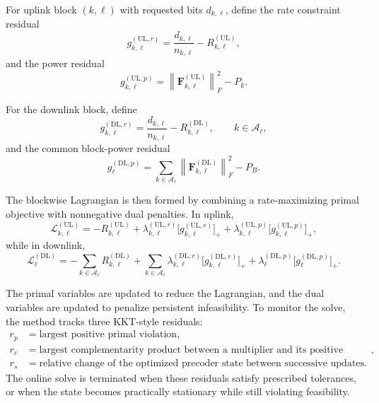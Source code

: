 \documentclass[11pt]{article}
\newcommand{\Aset}{\mathcal{A}}
\newcommand{\F}{\mathbf{F}}
\newcommand{\norm}[1]{\left\lVert #1 \right\rVert}
\newcommand{\UL}{\mathrm{UL}}
\newcommand{\DL}{\mathrm{DL}}
\begin{document}
For uplink block $(k,\ell)$ with requested bits $d_{k,\ell}$, define the rate
constraint residual
\begin{equation}
g_{k,\ell}^{(\UL,r)}
=
\frac{d_{k,\ell}}{n_{k,\ell}} - R_{k,\ell}^{(\UL)},
\label{eq:ul-rate-residual}
\end{equation}
and the power residual
\begin{equation}
g_{k,\ell}^{(\UL,p)}
=
\norm{\F_{k,\ell}^{(\UL)}}_F^2 - P_k.
\label{eq:ul-power-residual}
\end{equation}

For the downlink block, define
\begin{equation}
g_{k,\ell}^{(\DL,r)}
=
\frac{d_{k,\ell}}{n_{k,\ell}} - R_{k,\ell}^{(\DL)},
\qquad k\in\Aset_\ell,
\label{eq:dl-rate-residual}
\end{equation}
and the common block-power residual
\begin{equation}
g_{\ell}^{(\DL,p)}
=
\sum_{k\in\Aset_\ell}\norm{\F_{k,\ell}^{(\DL)}}_F^2 - P_B.
\label{eq:dl-power-residual}
\end{equation}

The blockwise Lagrangian is then formed by combining a rate-maximizing primal
objective with nonnegative dual penalties. In uplink,
\begin{equation}
\mathcal{L}_{k,\ell}^{(\UL)}
=
-R_{k,\ell}^{(\UL)}
+
\lambda_{k,\ell}^{(\UL,r)}\bigl[g_{k,\ell}^{(\UL,r)}\bigr]_+
+
\lambda_{k,\ell}^{(\UL,p)}\bigl[g_{k,\ell}^{(\UL,p)}\bigr]_+,
\label{eq:ul-lagrangian}
\end{equation}
while in downlink,
\begin{equation}
\mathcal{L}_{\ell}^{(\DL)}
=
-\sum_{k\in\Aset_\ell} R_{k,\ell}^{(\DL)}
+
\sum_{k\in\Aset_\ell}
\lambda_{k,\ell}^{(\DL,r)}\bigl[g_{k,\ell}^{(\DL,r)}\bigr]_+
+
\lambda_{\ell}^{(\DL,p)}\bigl[g_{\ell}^{(\DL,p)}\bigr]_+.
\label{eq:dl-lagrangian}
\end{equation}

The primal variables are updated to reduce the Lagrangian, and the dual
variables are updated to penalize persistent infeasibility. To monitor the
solve, the method tracks three KKT-style residuals:
\begin{align}
r_p
&=
\text{largest positive primal violation},
\label{eq:kkt-primal}
\\
r_c
&=
\text{largest complementarity product between a multiplier and its positive violation},
\label{eq:kkt-complementarity}
\\
r_s
&=
\text{relative change of the optimized precoder state between successive updates}.
\label{eq:kkt-stationarity}
\end{align}
The online solve is terminated when these residuals satisfy prescribed
tolerances, or when the state becomes practically stationary while still
violating feasibility.
\end{document}
